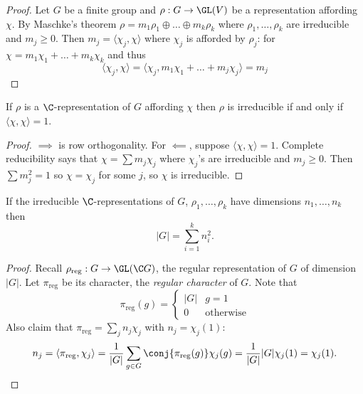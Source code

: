 \documentclass[a4paper]{article}
\begin{document}
\begin{proof}
  Let \(G\) be a finite group and \(\rho: G \to \GL(V)\) be a representation affording \(\chi\). By Maschke's theorem \(\rho = m_1 \rho_1 \oplus \dots \oplus m_k \rho_k\) where \(\rho_1, \dots, \rho_k\) are irreducible and \(m_j \geq 0\). Then \(m_j = \langle \chi_j, \chi \rangle\) where \(\chi_j\) is afforded by \(\rho_j\): for \(\chi = m_1 \chi_1 + \dots + m_k \chi_k\) and thus
  \[
    \langle \chi_j, \chi \rangle
    = \langle \chi_j, m_1 \chi_1 + \dots + m_j \chi_j \rangle
    = m_j
  \]
\end{proof}

\begin{corollary}
  If \(\rho\) is a \(\C\)-representation of \(G\) affording \(\chi\) then \(\rho\) is irreducible if and only if \(\langle \chi, \chi \rangle = 1\).
\end{corollary}

\begin{proof}
  \(\implies\) is row orthogonality. For \(\impliedby\), suppose \(\langle \chi, \chi \rangle = 1\). Complete reducibility says that \(\chi = \sum m_j \chi_j\) where \(\chi_j\)'s are irreducible and \(m_j \geq 0\). Then \(\sum m_j^2 = 1\) so \(\chi = \chi_j\) for some \(j\), so \(\chi\) is irreducible.
\end{proof}

\begin{theorem}
  If the irreducible \(\C\)-representations of \(G\), \(\rho_1, \dots, \rho_k\) have dimensions \(n_1, \dots, n_k\) then
  \[
    |G| = \sum_{i = 1}^k n_i^2.
  \]
\end{theorem}

\begin{proof}
  Recall \(\rho_{\text{reg}}: G \to \GL(\C G)\), the regular representation of \(G\) of dimension \(|G|\). Let \(\pi_{\text{reg}}\) be its character, the \emph{regular character} of \(G\). Note that
  \[
    \pi_{\text{reg}}(g) =
    \begin{cases}
      |G| & g = 1 \\
      0 & \text{otherwise}
    \end{cases}
  \]
  Also claim that \(\pi_{\text{reg}} = \sum_j n_j \chi_j\) with \(n_j = \chi_j(1)\):
  \[
    n_j
    = \langle \pi_{\text{reg}}, \chi_j \rangle
    = \frac{1}{|G|} \sum_{g \in G} \conj{\pi_{\text{reg}}(g)} \chi_j(g)
    = \frac{1}{|G|} |G| \chi_j(1)
    = \chi_j(1).
  \]
\end{proof}
\end{document}
